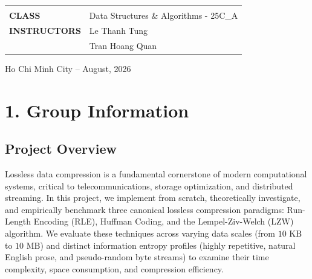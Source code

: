 \documentclass{article}
\begin{document}
\begin{titlepage}
\begin{center}
\begin{table}[H]
\begin{tabular}{l l}
         \vspace{6pt}\\ 
         \textbf{\fontsize{13pt}{0pt}\selectfont CLASS} & \fontsize{13pt}{0pt}\selectfont Data Structures \& Algorithms - 25C\_A \vspace{6pt} \\
         \textbf{\fontsize{13pt}{0pt}\selectfont INSTRUCTORS} & \fontsize{13pt}{0pt}\selectfont Le Thanh Tung \\ 
         & \fontsize{13pt}{0pt}\selectfont Tran Hoang Quan \\
            \end{tabular}
        \end{table}
        \vfill
        {\fontsize{13pt}{0pt}\selectfont Ho Chi Minh City -- August, 2026}
    \end{center}
\end{titlepage}

\cleardoublepage

\renewcommand{\contentsname}{Contents}
\tableofcontents
\thispagestyle{empty}
\cleardoublepage

\setcounter{page}{3}

\section*{1. Group Information}
\setcounter{section}{1}
\setcounter{subsection}{0}
\setcounter{subsubsection}{0}

\subsection{Project Overview}
Lossless data compression is a fundamental cornerstone of modern computational systems, critical to telecommunications, storage optimization, and distributed streaming. In this project, we implement from scratch, theoretically investigate, and empirically benchmark three canonical lossless compression paradigms: Run-Length Encoding (RLE), Huffman Coding, and the Lempel-Ziv-Welch (LZW) algorithm. We evaluate these techniques across varying data scales (from $10\text{ KB}$ to $10\text{ MB}$) and distinct information entropy profiles (highly repetitive, natural English prose, and pseudo-random byte streams) to examine their time complexity, space consumption, and compression efficiency.
\end{document}
